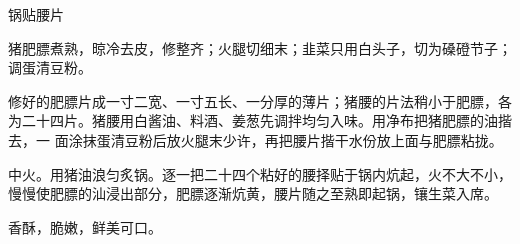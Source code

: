 %
%
%
%
%
%
%
\begin{recipe}{锅贴腰片}

\ingredients


\preparation

\step 猪肥膘煮熟，晾冷去皮，修整齐；火腿切细末；韭菜只用白头子，切为磉磴节子；
调蛋清豆粉。

\step 修好的肥膘片成一寸二宽、一寸五长、一分厚的薄片；猪腰的片法稍小于肥膘，各
为二十四片。猪腰用白酱油、料酒、姜葱先调拌均匀入味。用净布把猪肥膘的油揩去，一
面涂抹蛋清豆粉后放火腿末少许，再把腰片揩干水份放上面与肥膘粘拢。

\step 中火。用猪油浪匀炙锅。逐一把二十四个粘好的腰择贴于锅内炕起，火不大不小，
慢慢使肥膘的汕浸出部分，肥膘逐渐炕黄，腰片随之至熟即起锅，镶生菜入席。

\features

香酥，脆嫩，鲜美可口。

\end{recipe}

